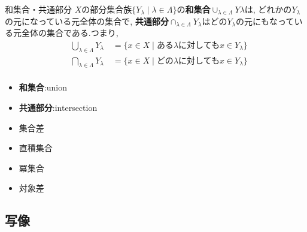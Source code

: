 \documentclass[dvipdfmx,b4j]{jsarticle}
\begin{document}
\subsubsection{}
\begin{definition}{和集合・共通部分}{}
$X$の部分集合族$\{Y_\lambda\mid\lambda\in\Lambda\}$の\textbf{和集合}$\cup_{\lambda\in\Lambda}Y\lambda$は,
どれかの$Y_\lambda$の元になっている元全体の集合で,
\textbf{共通部分}$\cap_{\lambda\in\Lambda}Y_\lambda$はどの$Y_\lambda$の元にもなっている元全体の集合である.つまり,
\begin{align*}
&\bigcup_{\lambda\in\Lambda}Y_\lambda\quad=\{x\in X\mid \text{ある}\lambda\text{に対しても}x\in Y_\lambda\}\\
&\bigcap_{\lambda\in\Lambda}Y_\lambda\quad=\{x\in X\mid \text{どの}\lambda\text{に対しても}x\in Y_\lambda\}\\
\end{align*}
\tcbline
\begin{itemize}
    \item \textbf{和集合}:union
    \item \textbf{共通部分}:intersection
\end{itemize}
\end{definition}
\begin{itemize}
\item 集合差
\item 直積集合
\item 冪集合
\item 対象差
\end{itemize}
\subsection{写像}
\end{document}
